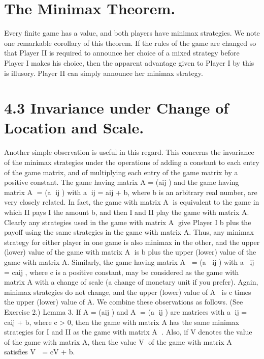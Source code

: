 \documentclass[]{report}
\begin{document}
\section{The Minimax Theorem.} Every finite game has a value, and both players have minimax
strategies.
We note one remarkable corollary of this theorem. If the rules of the game are changed
so that Player II is required to announce her choice of a mixed strategy before Player I
makes his choice, then the apparent advantage given to Player I by this is illusory. Player
II can simply announce her minimax strategy.
\section{4.3 Invariance under Change of Location and Scale.} Another simple observation
is useful in this regard. This concerns the invariance of the minimax strategies under
the operations of adding a constant to each entry of the game matrix, and of multiplying
each entry of the game matrix by a positive constant. The game having matrix A = (aij )
and the game having matrix A = (a
ij ) with a
ij = aij + b, where b is an arbitrary real
number, are very closely related. In fact, the game with matrix A is equivalent to the
game in which II pays I the amount b, and then I and II play the game with matrix A.
Clearly any strategies used in the game with matrix A give Player I b plus the payoff
using the same strategies in the game with matrix A. Thus, any minimax strategy for
either player in one game is also minimax in the other, and the upper (lower) value of the
game with matrix A is b plus the upper (lower) value of the game with matrix A.
Similarly, the game having matrix A = (a
ij ) with a
ij = caij , where c is a positive
constant, may be considered as the game with matrix A with a change of scale (a change
of monetary unit if you prefer). Again, minimax strategies do not change, and the upper
(lower) value of A is c times the upper (lower) value of A. We combine these observations
as follows. (See Exercise 2.)
Lemma 3. If A = (aij ) and A = (a
ij ) are matrices with a
ij = caij + b, where c > 0,
then the game with matrix A has the same minimax strategies for I and II as the game
with matrix A
. Also, if V denotes the value of the game with matrix A, then the value
V  of the game with matrix A satisfies V  = cV + b.

\end{document}

